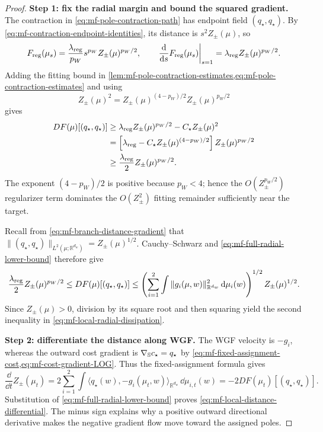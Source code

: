\begin{proof}
\noindent\textbf{Step 1: fix the radial margin and bound the squared gradient.}
The contraction in \cref{eq:mf-pole-contraction-path} has endpoint field
\((q_\star,q_\star)\). By
\cref{eq:mf-contraction-endpoint-identities}, its distance is
\(s^2Z_\pm(\mu)\), so
\[
 F_{\mathrm{reg}}(\mu_s)
 =\frac{\lambda_{\mathrm{reg}}}{p_W}s^{p_W}Z_\pm(\mu)^{p_W/2},
 \qquad
 \left.\frac{\dd}{\dd s}F_{\mathrm{reg}}(\mu_s)\right|_{s=1}
 =\lambda_{\mathrm{reg}} Z_\pm(\mu)^{p_W/2}.
\]
Adding the fitting bound in
\cref{lem:mf-pole-contraction-estimates,eq:mf-pole-contraction-estimates}
and using
\[
Z_\pm(\mu)^2
 =Z_\pm(\mu)^{(4-p_W)/2}Z_\pm(\mu)^{p_W/2}
\]
gives
\begin{align}
 DF(\mu)[(q_\star,q_\star)]
 &\ge \lambda_{\mathrm{reg}} Z_\pm(\mu)^{p_W/2}-C_\star Z_\pm(\mu)^2\notag\\
 &=\left[\lambda_{\mathrm{reg}}-C_\star Z_\pm(\mu)^{(4-p_W)/2}\right]
                  Z_\pm(\mu)^{p_W/2}\notag\\
 &\ge\frac{\lambda_{\mathrm{reg}}}{2}Z_\pm(\mu)^{p_W/2}.
 \label{eq:mf-full-radial-lower-bound}
\end{align}
The exponent \((4-p_W)/2\) is positive because \(p_W<4\); hence the
\(O(Z_\pm^{p_W/2})\) regularizer term dominates the
\(O(Z_\pm^2)\) fitting remainder sufficiently near the target.

Recall from \cref{eq:mf-branch-distance-gradient} that
\(\|(q_\star,q_\star)\|_{L^2(\mu;\mathbb R^{d_w})}
=Z_\pm(\mu)^{1/2}\). Cauchy--Schwarz and
\cref{eq:mf-full-radial-lower-bound} therefore give
\[
 \frac{\lambda_{\mathrm{reg}}}{2}Z_\pm(\mu)^{p_W/2}
 \le DF(\mu)[(q_\star,q_\star)]
 \le
 \left(\sum_{i=1}^2\int
       \|g_i(\mu,w)\|_{\mathbb R^{d_w}}^2\,\dd\mu_i(w)\right)^{1/2}
 Z_\pm(\mu)^{1/2}.
\]
Since \(Z_\pm(\mu)>0\), division by its square root and then squaring yield
the second inequality in \cref{eq:mf-local-radial-dissipation}.

\par\noindent\textbf{Step 2: differentiate the distance along WGF.}
The WGF velocity is \(-g_i\), whereas the outward cost gradient is
\(\nabla_{\mathbb{S}} c_\star=q_\star\) by
\cref{eq:mf-fixed-assignment-cost,eq:mf-cost-gradient-LOG}. Thus the
fixed-assignment formula gives
\[
 \frac{\dd}{\dd t}Z_\pm(\mu_t)
 =2\sum_{i=1}^2\int
   \langle q_\star(w),-g_i(\mu_t,w)\rangle_{\mathbb R^{d_w}}
   \,\dd\mu_{i,t}(w)
 =-2DF(\mu_t)[(q_\star,q_\star)].
\]
Substitution of \cref{eq:mf-full-radial-lower-bound} proves
\cref{eq:mf-local-distance-differential}. The minus sign explains why a
positive outward directional derivative makes the negative gradient flow
move toward the assigned poles.


\end{proof}
